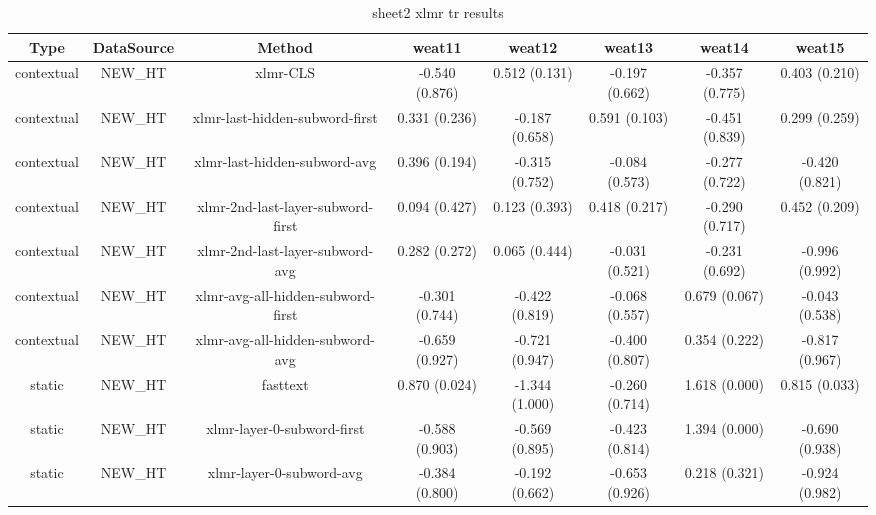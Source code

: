 \begin{sidewaystable}[htb]
    \centering
    \caption{sheet2 xlmr tr results}
    \label{appendix_tab:sheet2_xlmr_tr_results}
    \small
    \begin{tabular}{@{}cccccccc@{}}
        \toprule
        Type & DataSource & Method & weat11 & weat12 & weat13 & weat14 & weat15 \\
        \midrule
        contextual & NEW\_HT & xlmr-CLS & -0.540 (0.876) & 0.512 (0.131) & -0.197 (0.662) & -0.357 (0.775) & 0.403 (0.210) \\
        contextual & NEW\_HT & xlmr-last-hidden-subword-first & 0.331 (0.236) & -0.187 (0.658) & 0.591 (0.103) & -0.451 (0.839) & 0.299 (0.259) \\
        contextual & NEW\_HT & xlmr-last-hidden-subword-avg & 0.396 (0.194) & -0.315 (0.752) & -0.084 (0.573) & -0.277 (0.722) & -0.420 (0.821) \\
        contextual & NEW\_HT & xlmr-2nd-last-layer-subword-first & 0.094 (0.427) & 0.123 (0.393) & 0.418 (0.217) & -0.290 (0.717) & 0.452 (0.209) \\
        contextual & NEW\_HT & xlmr-2nd-last-layer-subword-avg & 0.282 (0.272) & 0.065 (0.444) & -0.031 (0.521) & -0.231 (0.692) & -0.996 (0.992) \\
        contextual & NEW\_HT & xlmr-avg-all-hidden-subword-first & -0.301 (0.744) & -0.422 (0.819) & -0.068 (0.557) & 0.679 (0.067) & -0.043 (0.538) \\
        contextual & NEW\_HT & xlmr-avg-all-hidden-subword-avg & -0.659 (0.927) & -0.721 (0.947) & -0.400 (0.807) & 0.354 (0.222) & -0.817 (0.967) \\
        static & NEW\_HT & fasttext & 0.870 (0.024) & -1.344 (1.000) & -0.260 (0.714) & 1.618 (0.000) & 0.815 (0.033) \\
        static & NEW\_HT & xlmr-layer-0-subword-first & -0.588 (0.903) & -0.569 (0.895) & -0.423 (0.814) & 1.394 (0.000) & -0.690 (0.938) \\
        static & NEW\_HT & xlmr-layer-0-subword-avg & -0.384 (0.800) & -0.192 (0.662) & -0.653 (0.926) & 0.218 (0.321) & -0.924 (0.982) \\
        \bottomrule
    \end{tabular}
\end{sidewaystable}